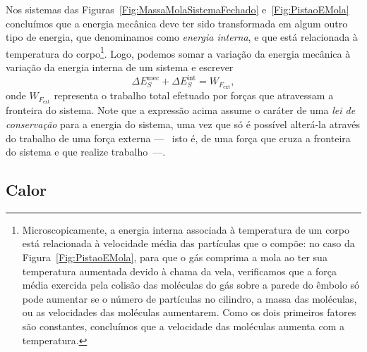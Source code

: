 Nos sistemas das Figuras~\ref{Fig:MassaMolaSistemaFechado} e~\ref{Fig:PistaoEMola} concluímos que a energia mecânica deve ter sido transformada em algum outro tipo de energia, que denominamos como \emph{energia interna}, e que está relacionada à temperatura do corpo\footnote[][-3cm]{Microscopicamente, a energia interna associada à temperatura de um corpo está relacionada à velocidade média das partículas que o compõe: no caso da Figura~\ref{Fig:PistaoEMola}, para que o gás comprima a mola ao ter sua temperatura aumentada devido à chama da vela, verificamos que a força média exercida pela colisão das moléculas do gás sobre a parede do êmbolo só pode aumentar se o número de partículas no cilindro, a massa das moléculas, ou as velocidades das moléculas aumentarem. Como os dois primeiros fatores são constantes, concluímos que a velocidade das moléculas aumenta com a temperatura.}. Logo, podemos somar a variação da energia mecânica à variação da energia interna de um sistema e escrever
\begin{equation}\label{Eq:ConservacaoDaEnergia1}
    \Delta E_S^{\text{mec}} + \Delta E_S^{\text{int}} = W_{F_{\text{ext}}},
\end{equation}
%
onde $W_{F_{\text{ext}}}$ representa o trabalho total efetuado por forças que atravessam a fronteira do sistema. Note que a expressão acima assume o caráter de uma \emph{lei de conservação} para a energia do sistema, uma vez que só é possível alterá-la através do trabalho de uma força externa ---~ isto é, de uma força que cruza a fronteira do sistema e que realize trabalho~---.

\subsection{Calor}

